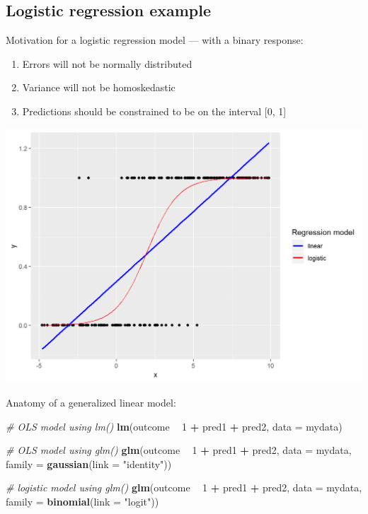 \documentclass[]{book}
\newenvironment{Shaded}{\begin{snugshade}}{\end{snugshade}}
\newcommand{\CommentTok}[1]{\textcolor[rgb]{0.56,0.35,0.01}{\textit{#1}}}
\newcommand{\DataTypeTok}[1]{\textcolor[rgb]{0.13,0.29,0.53}{#1}}
\newcommand{\DecValTok}[1]{\textcolor[rgb]{0.00,0.00,0.81}{#1}}
\newcommand{\KeywordTok}[1]{\textcolor[rgb]{0.13,0.29,0.53}{\textbf{#1}}}
\newcommand{\NormalTok}[1]{#1}
\newcommand{\OperatorTok}[1]{\textcolor[rgb]{0.81,0.36,0.00}{\textbf{#1}}}
\newcommand{\StringTok}[1]{\textcolor[rgb]{0.31,0.60,0.02}{#1}}
\providecommand{\tightlist}{%
  \setlength{\itemsep}{0pt}\setlength{\parskip}{0pt}}
\begin{document}
\hypertarget{logistic-regression-example}{%
\subsection{Logistic regression example}\label{logistic-regression-example}}

Motivation for a logistic regression model --- with a binary response:

\begin{enumerate}
\def\labelenumi{\arabic{enumi}.}
\tightlist
\item
  Errors will not be normally distributed
\item
  Variance will not be homoskedastic
\item
  Predictions should be constrained to be on the interval {[}0, 1{]}
\end{enumerate}

\includegraphics{R/Rmodels/images/logistic.png}

Anatomy of a generalized linear model:

\begin{Shaded}
\begin{Highlighting}[]
  \CommentTok{# OLS model using lm()}
  \KeywordTok{lm}\NormalTok{(outcome }\OperatorTok{~}\StringTok{ }\DecValTok{1} \OperatorTok{+}\StringTok{ }\NormalTok{pred1 }\OperatorTok{+}\StringTok{ }\NormalTok{pred2, }
     \DataTypeTok{data =}\NormalTok{ mydata)}

  \CommentTok{# OLS model using glm()}
  \KeywordTok{glm}\NormalTok{(outcome }\OperatorTok{~}\StringTok{ }\DecValTok{1} \OperatorTok{+}\StringTok{ }\NormalTok{pred1 }\OperatorTok{+}\StringTok{ }\NormalTok{pred2, }
      \DataTypeTok{data =}\NormalTok{ mydata, }
      \DataTypeTok{family =} \KeywordTok{gaussian}\NormalTok{(}\DataTypeTok{link =} \StringTok{"identity"}\NormalTok{))}
 
  \CommentTok{# logistic model using glm()}
  \KeywordTok{glm}\NormalTok{(outcome }\OperatorTok{~}\StringTok{ }\DecValTok{1} \OperatorTok{+}\StringTok{ }\NormalTok{pred1 }\OperatorTok{+}\StringTok{ }\NormalTok{pred2, }
      \DataTypeTok{data =}\NormalTok{ mydata, }
      \DataTypeTok{family =} \KeywordTok{binomial}\NormalTok{(}\DataTypeTok{link =} \StringTok{"logit"}\NormalTok{))}
\end{Highlighting}
\end{Shaded}
\end{document}
